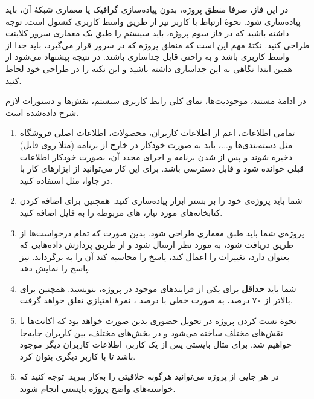 \documentclass[]{article}
\begin{document}
در این فاز، صرفا منطق پروژه، بدون پیاده‌سازی گرافیک یا معماری شبکهٔ آن، باید پیاده‌سازی شود. نحوهٔ ارتباط با کاربر نیز از طریق واسط کاربری کنسول است. توجه داشته باشید که در فاز سوم پروژه، باید سیستم را طبق یک معماری سرور-کلاینت طراحی کنید. نکتهٔ مهم این است که منطق پروژه که در سرور قرار می‌گیرد، باید جدا از واسط کاربری باشد و به راحتی قابل جداسازی باشند. در نتیجه پیشنهاد می‌شود از همین ابتدا نگاهی به این جداسازی داشته‌ باشید و این نکته را در طراحی خود لحاظ کنید.

در ادامهٔ مستند، موجودیت‌ها، نمای کلی رابط کاربری سیستم، نقش‌ها و دستورات لازم شرح داده‌شده است.

\begin{enumerate}[label={نکته \arabic*:}]
\item
 تمامی اطلاعات، اعم از اطلاعات کاربران، محصولات، اطلاعات اصلی فروشگاه مثل دسته‌بندی‌ها و...، باید به صورت خودکار در خارج از برنامه (مثلا روی فایل) ذخیره شوند و پس از  شدن برنامه و اجرای مجدد آن، بصورت خودکار اطلاعات قبلی خوانده شود و قابل دسترسی باشد. برای این کار می‌توانید از ابزارهای کار با  در جاوا، مثل
  \href{https://www.tutorialspoint.com/gson/gson_quick_guide.htm}{\textcolor{blue}{}}
   استفاده‌ کنید.

\item
شما باید پروژه‌ی خود را بر بستر ابزار  پیاده‌سازی کنید. همچنین برای اضافه کردن کتابخانه‌های مورد نیاز،  های مربوطه را به فایل  اضافه کنید.

\item
پروژه‌ی شما باید طبق معماری  طراحی شود. بدین صورت که تمام درخواست‌ها از طریق  دریافت شود، به  مورد نظر ارسال شود و  از طریق پردازش داده‌هایی که بعنوان  دارد، تغییرات را اعمال کند، پاسخ را محاسبه کند آن را به  برگرداند.  نیز پاسخ را نمایش دهد.

\item
شما باید \textbf{حداقل} برای یکی از فرایندهای موجود در پروژه،  بنویسید. همچنین برای  بالاتر از ۷۰ درصد، به صورت خطی با درصد ، نمره‌ٔ امتیازی تعلق خواهد گرفت.

   
\item
 نحوهٔ تست کردن پروژه در تحویل حضوری بدین صورت خواهد بود که اکانت‌ها با نقش‌های مختلف ساخته‌ می‌شود و در بخش‌های مختلف، بین کاربران جابه‌جا خواهیم‌ شد. برای مثال بایستی پس از  یک کاربر، اطلاعات کاربران دیگر موجود باشد تا با کاربر دیگری بتوان  کرد.

\item
در هر جایی از پروژه می‌توانید هرگونه خلاقیتی را به‌کار ببرید. توجه کنید که خواسته‌های واضح پروژه بایستی انجام شوند.
\end{enumerate}
\end{document}
